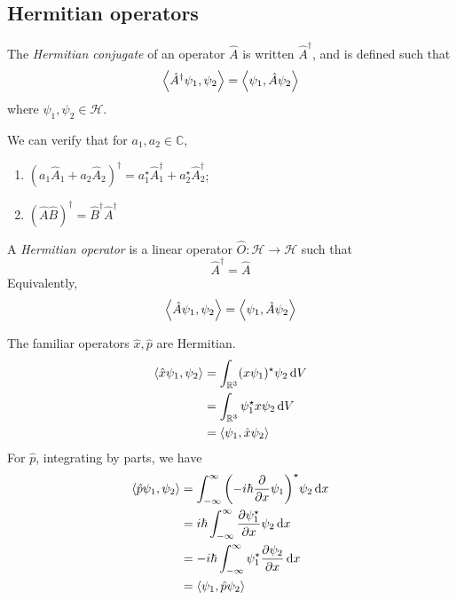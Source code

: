 \subsection{Hermitian operators}
\begin{definition}
	The \textit{Hermitian conjugate} of an operator \( \hat A \) is written \( \hat A^\dagger \), and is defined such that
	\[
		\left\langle{\hat A^\dagger \psi_1, \psi_2}\right\rangle = \left\langle{\psi_1, \hat A \psi_2}\right\rangle
	\]
	where \( \psi_1, \psi_2 \in \mathcal H \).
\end{definition}
We can verify that for \( a_1, a_2 \in \mathbb C \),
\begin{enumerate}
	\item \( (a_1 \hat A_1 + a_2 \hat A_2 )^\dagger = a_1^\star \hat A_1^\dagger + a_2^\star \hat A_2^\dagger \);
	\item \( (\hat A \hat B)^\dagger = \hat B^\dagger \hat A^\dagger \)
\end{enumerate}
\begin{definition}
	A \textit{Hermitian operator} is a linear operator \( \hat O \colon \mathcal H \to \mathcal H \) such that
	\[
		\hat A^\dagger = \hat A
	\]
	Equivalently,
	\[
		\left\langle{\hat A \psi_1, \psi_2}\right\rangle = \left\langle{\psi_1, \hat A \psi_2}\right\rangle
	\]
\end{definition}
\begin{example}
	The familiar operators \( \hat x, \hat p \) are Hermitian.
	\begin{align*}
		\left\langle{\hat x \psi_1, \psi_2}\right\rangle & = \int_{\mathbb R^3} (x \psi_1)^\star \psi_2 \dd{V} \\
		                              & = \int_{\mathbb R^3} \psi_1^\star x \psi_2 \dd{V}   \\
		                              & = \left\langle{\psi_1, \hat x \psi_2}\right\rangle
	\end{align*}
	For \( \hat p \), integrating by parts, we have
	\begin{align*}
		\left\langle{\hat p \psi_1, \psi_2}\right\rangle & = \int_{-\infty}^\infty \qty(-i\hbar \pdv{x} \psi_1)^\star \psi_2 \dd{x} \\
		                              & = i \hbar \int_{-\infty}^\infty \pdv{\psi_1^\star}{x} \psi_2 \dd{x}      \\
		                              & = -i\hbar \int_{-\infty}^\infty \psi_1^\star \pdv{\psi_2}{x} \dd{x}      \\
		                              & = \left\langle{\psi_1, \hat p \psi_2}\right\rangle
	\end{align*}
\end{example}

